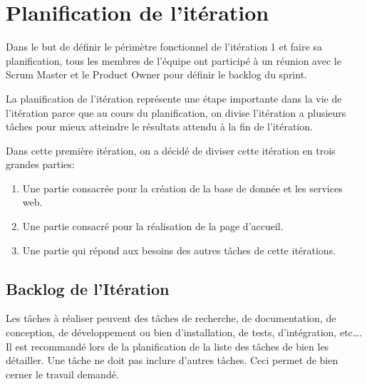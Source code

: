 

\section{Planification de l'itération}

Dans le but de définir le périmètre fonctionnel de l'itération 1 et faire sa
planification, tous les membres de l'équipe ont participé à un réunion avec le
Scrum Master et le Product Owner pour définir le backlog du sprint.

La planification de l'itération représente une étape importante dans la vie de
l'itération parce que au cours du planification, on divise l'itération a
plusieurs tâches pour mieux atteindre le résultats attendu à la fin de
l'itération.

Dans cette première itération, on a décidé de diviser cette itération en trois
grandes parties:

\begin{enumerate}
    \item Une partie consacrée pour la création de la base de donnée et les
        services web.
    \item Une partie consacré pour la réalisation de la page d'accueil.
    \item Une partie qui répond aux besoins des autres tâches de cette
        itérations.
\end{enumerate}

\subsection{Backlog de l'Itération}

Les tâches à réaliser peuvent  des tâches de
recherche, de documentation, de conception, de développement ou bien
d'installation, de tests, d'intégration, etc\ldots. Il est recommandé lors de
la planification de la liste des tâches de bien les détailler. Une tâche ne
doit pas inclure d'autres tâches. Ceci permet de bien cerner le travail
demandé.

